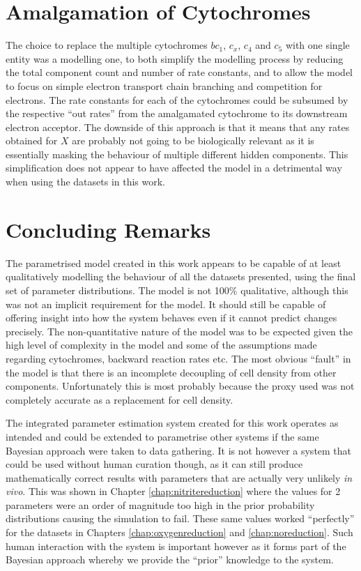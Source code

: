 \section{Amalgamation of Cytochromes}
The choice to replace the multiple cytochromes $bc_1$, $c_x$, $c_4$ and $c_5$ with one single entity was a modelling one, to both simplify the modelling process by reducing the total component count and number of rate constants, and to allow the model to focus on simple electron transport chain branching and competition for electrons. The rate constants for each of the cytochromes could be subsumed by the respective ``out rates'' from the amalgamated cytochrome to its downstream electron acceptor. The downside of this approach is that it means that any rates obtained for $X$ are probably not going to be biologically relevant as it is essentially masking the behaviour of multiple different hidden components. This simplification does not appear to have affected the model in a detrimental way when using the datasets in this work.

\section{Concluding Remarks}
The parametrised model created in this work appears to be capable of at least qualitatively modelling the behaviour of all the datasets presented, using the final set of parameter distributions. The model is not 100\% qualitative, although this was not an implicit requirement for the model. It should still be capable of offering insight into how the system behaves even if it cannot predict changes precisely. The non-quantitative nature of the model was to be expected given the high level of complexity in the model and some of the assumptions made regarding cytochromes, backward reaction rates etc. The most obvious ``fault'' in the model is that there is an incomplete decoupling of cell density from other components. Unfortunately this is most probably because the proxy used was not completely accurate as a replacement for cell density.

The integrated parameter estimation system created for this work operates as intended and could be extended to parametrise other systems if the same Bayesian approach were taken to data gathering. It is not however a system that could be used without human curation though, as it can still produce mathematically correct results with parameters that are actually very unlikely \textit{in vivo}. This was shown in Chapter \ref{chap:nitritereduction} where the values for 2 parameters were an order of magnitude too high in the prior probability distributions causing the simulation to fail. These same values worked ``perfectly'' for the datasets in Chapters \ref{chap:oxygenreduction} and \ref{chap:noreduction}. Such human interaction with the system is important however as it forms part of the Bayesian approach whereby we provide the ``prior'' knowledge to the system.

